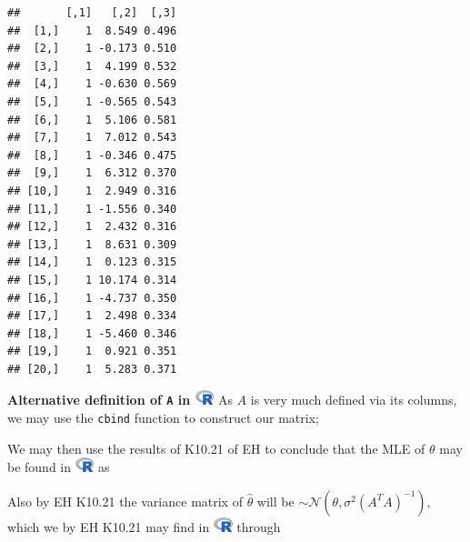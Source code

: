 \documentclass[
]{article}
\newenvironment{Shaded}{\begin{snugshade}}{\end{snugshade}}
\newcommand{\DecValTok}[1]{\textcolor[rgb]{0.00,0.00,0.81}{#1}}
\newcommand{\KeywordTok}[1]{\textcolor[rgb]{0.13,0.29,0.53}{\textbf{#1}}}
\newcommand{\NormalTok}[1]{#1}
\newcommand{\OperatorTok}[1]{\textcolor[rgb]{0.81,0.36,0.00}{\textbf{#1}}}
\newcommand{\StringTok}[1]{\textcolor[rgb]{0.31,0.60,0.02}{#1}}
\begin{document}
\begin{verbatim}
##       [,1]   [,2]  [,3]
##  [1,]    1  8.549 0.496
##  [2,]    1 -0.173 0.510
##  [3,]    1  4.199 0.532
##  [4,]    1 -0.630 0.569
##  [5,]    1 -0.565 0.543
##  [6,]    1  5.106 0.581
##  [7,]    1  7.012 0.543
##  [8,]    1 -0.346 0.475
##  [9,]    1  6.312 0.370
## [10,]    1  2.949 0.316
## [11,]    1 -1.556 0.340
## [12,]    1  2.432 0.316
## [13,]    1  8.631 0.309
## [14,]    1  0.123 0.315
## [15,]    1 10.174 0.314
## [16,]    1 -4.737 0.350
## [17,]    1  2.498 0.334
## [18,]    1 -5.460 0.346
## [19,]    1  0.921 0.351
## [20,]    1  5.283 0.371
\end{verbatim}

\textbf{Alternative definition of \texttt{A} in
\includegraphics[width=\textwidth,height=0.16667in]{R_logo.png}} As
\(A\) is very much defined via its columns, we may use the
\texttt{cbind} function to construct our matrix;

\begin{Shaded}
\end{Shaded}

We may then use the results of K10.21 of EH to conclude that the MLE of
\(\theta\) may be found in
\includegraphics[width=\textwidth,height=0.16667in]{R_logo.png} as

\begin{Shaded}
\end{Shaded}

Also by EH K10.21 the variance matrix of \(\hat\theta\) will be
\(\sim\mathcal{N}\left({{\theta},{\sigma^2\left({A^TA}\right)^{-1}}}\right),\)
which we by EH K10.21 may find in
\includegraphics[width=\textwidth,height=0.16667in]{R_logo.png} through
\end{document}
